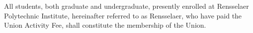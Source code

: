 All students, both graduate and undergraduate, presently enrolled at Rensselaer Polytechnic Institute, hereinafter referred to as Rensselaer, who have paid the Union Activity Fee, shall constitute the membership of the Union.